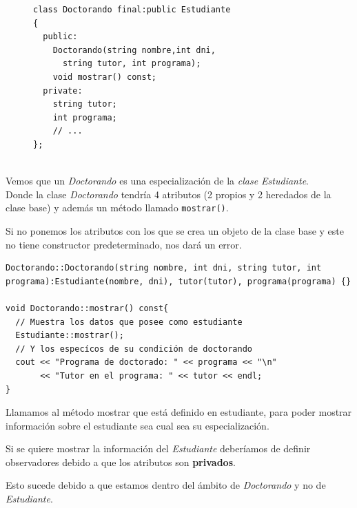 \begin{figure}[h]
\begin{minipage}[t]{0.7\textwidth}
\begin{lstlisting}[frame=single]
class Doctorando final:public Estudiante
{
  public:
    Doctorando(string nombre,int dni,
	  string tutor, int programa);
    void mostrar() const;
  private:
    string tutor; 
    int programa; 
    // ...
};
	\end{lstlisting}
\end{minipage}
\end{figure}\\

Vemos que un \textit{Doctorando} es una especialización de la \textit{clase Estudiante}.\\
Donde la clase \textit{Doctorando} tendría 4 atributos (2 propios y 2 heredados de la clase base) y además un método llamado \texttt{mostrar()}.

Si no ponemos los atributos con los que se crea un objeto de la clase base y este no tiene constructor predeterminado, nos dará un error.
\begin{center}
	\begin{lstlisting}[frame=single]
Doctorando::Doctorando(string nombre, int dni, string tutor, int programa):Estudiante(nombre, dni), tutor(tutor), programa(programa) {}
  
void Doctorando::mostrar() const{
  // Muestra los datos que posee como estudiante
  Estudiante::mostrar();
  // Y los especícos de su condición de doctorando
  cout << "Programa de doctorado: " << programa << "\n"
       << "Tutor en el programa: " << tutor << endl;
}
\end{lstlisting}
\end{center}

Llamamos al método mostrar que está definido en estudiante, para poder mostrar información sobre el estudiante sea cual sea su especialización.

Si se quiere mostrar la información del \textit{Estudiante} deberíamos de definir observadores debido a que los atributos son \textbf{privados}.

Esto sucede debido a que estamos dentro del ámbito de \textit{Doctorando} y no de \textit{Estudiante}.

